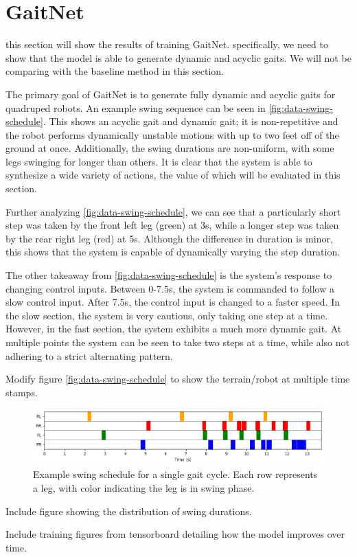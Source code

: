 \section{GaitNet}

\begin{todo}
  this section will show the results of training GaitNet.
  specifically, we need to show that the model is able to generate
  dynamic and acyclic gaits. We will not be comparing with the baseline
  method in this section.
\end{todo}

The primary goal of GaitNet is to generate fully dynamic and acyclic
gaits for quadruped robots. An example swing sequence can be seen in
\autoref{fig:data-swing-schedule}. This shows an acyclic
gait and dynamic gait; it is non-repetitive and the robot performs
dynamically unstable motions with up to two feet off of the ground
at once.
Additionally, the swing durations are non-uniform, with some legs
swinging for longer than others. It is clear that the system is able to
synthesize a wide variety of actions, the value of which will be evaluated
in this section.

Further analyzing \autoref{fig:data-swing-schedule}, we can see that
a particularly short step was taken by the front left leg (green) at 3s,
while a longer step was taken by the rear right leg (red) at 5s. Although
the difference in duration is minor, this shows that the system is capable
of dynamically varying the step duration.

The other takeaway from \autoref{fig:data-swing-schedule} is the
system's response to changing control inputs. Between 0-7.5s, the
system is commanded to follow a slow control input. After 7.5s, the
control input is changed to a faster speed. In the slow section,
the system is very cautious, only taking one step at a time. However,
in the fast section, the system exhibits a much more dynamic gait. At
multiple points the system can be seen to take two steps at a time,
while also not adhering to a strict alternating pattern.

\begin{todo}
  Modify figure \autoref{fig:data-swing-schedule} to show
  the terrain/robot at multiple time stamps.
\end{todo}

\begin{figure}[H]
  \centering
  \includegraphics[width=\textwidth]{images/data/swing-schedule.png}
  \caption{Example swing schedule for a single gait cycle. Each row
  represents a leg, with color indicating the leg is in swing phase.}
  \label{fig:data-swing-schedule}
\end{figure}

\begin{todo}
  Include figure showing the distribution of swing durations.
\end{todo}

\begin{todo}
  Include training figures from tensorboard detailing how the model
  improves over time.
\end{todo}
